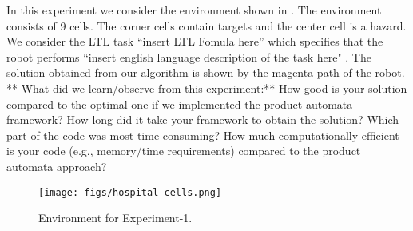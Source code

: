 \documentclass[letter paper, 10 pt, conference]{ieeeconf}
\begin{document}
In this experiment we consider the environment shown in .
The environment consists of 9 cells. The corner cells contain targets and the center cell is a hazard.
We consider the LTL task ``insert LTL Fomula here'' which specifies that the robot performs ``insert english language description of the task here" .
The solution obtained from our algorithm is shown by the magenta path of the robot.
** What did we learn/observe from this experiment:**
How good is your solution compared to the optimal one if we implemented the product automata framework?
How long did it take your framework to obtain the solution?
Which part of the code was most time consuming?
How much computationally efficient is your code  (e.g., memory/time requirements) compared to the product automata approach?
\begin{figure}
    \centering
    \texttt{[image: figs/hospital-cells.png]}
    \caption{Environment for Experiment-1.}
    \label{fig:env1}
\end{figure}


% 
\end{document}
